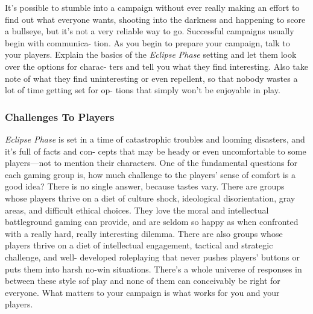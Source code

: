 It's possible to stumble into a campaign without ever 
really making an effort to find out what everyone 
wants, shooting into the darkness and happening to 
score a bullseye, but it's not a very reliable way to go. 
Successful campaigns usually begin with communica-
tion. As you begin to prepare your campaign, talk to 
your players. Explain the basics of the \textit{Eclipse Phase}
setting and let them look over the options for charac-
ters and tell you what they find interesting. Also take 
note of what they find uninteresting or even repellent, 
so that nobody wastes a lot of time getting set for op-
tions that simply won't be enjoyable in play.

\subsubsection{Challenges To Players }

\textit{Eclipse Phase} is set in a time of catastrophic troubles 
and looming disasters, and it's full of facts and con-
cepts that may be heady or even uncomfortable to 
some players—not to mention their characters. One of 
the fundamental questions for each gaming group is, 
how much challenge to the players' sense of comfort is 
a good idea? There is no single answer, because tastes 
vary. There are groups whose players thrive on a diet 
of culture shock, ideological disorientation, gray areas, 
and difficult ethical choices. They love the moral and 
intellectual battleground gaming can provide, and 
are seldom so happy as when confronted with a 
really hard, really interesting dilemma. There are also 
groups whose players thrive on a diet of intellectual 
engagement, tactical and strategic challenge, and well-
developed roleplaying that never pushes players' 
buttons or puts them into harsh no-win situations. 
There's a whole universe of responses in between these 
style sof play and none of them can conceivably be 
right for everyone. What matters to your campaign is 
what works for you and your players. 

